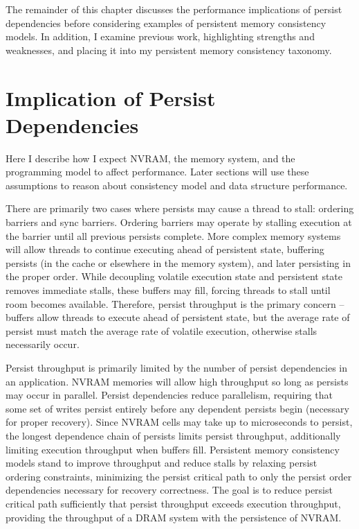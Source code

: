 The remainder of this chapter discusses the performance implications of persist dependencies before considering examples of persistent memory consistency models.
In addition, I examine previous work, highlighting strengths and weaknesses, and placing it into my persistent memory consistency taxonomy.

\section{Implication of Persist Dependencies}
\label{sec:PMC:Performance}

Here I describe how I expect NVRAM, the memory system, and the programming model to affect performance.
Later sections will use these assumptions to reason about consistency model and data structure performance.

There are primarily two cases where persists may cause a thread to stall: ordering barriers and sync barriers.
Ordering barriers may operate by stalling execution at the barrier until all previous persists complete.
More complex memory systems will allow threads to continue executing ahead of persistent state, buffering persists (in the cache or elsewhere in the memory system), and later persisting in the proper order.
While decoupling volatile execution state and persistent state removes immediate stalls, these buffers may fill, forcing threads to stall until room becomes available.
Therefore, persist throughput is the primary concern -- buffers allow threads to execute ahead of persistent state, but the average rate of persist must match the average rate of volatile execution, otherwise stalls necessarily occur.

Persist throughput is primarily limited by the number of persist dependencies in an application.
NVRAM memories will allow high throughput so long as persists may occur in parallel.
Persist dependencies reduce parallelism, requiring that some set of writes persist entirely before any dependent persists begin (necessary for proper recovery).
Since NVRAM cells may take up to microseconds to persist, the longest dependence chain of persists limits persist throughput, additionally limiting execution throughput when buffers fill.
Persistent memory consistency models stand to improve throughput and reduce stalls by relaxing persist ordering constraints, minimizing the persist critical path to only the persist order dependencies necessary for recovery correctness.
The goal is to reduce persist critical path sufficiently that persist throughput exceeds execution throughput, providing the throughput of a DRAM system with the persistence of NVRAM.

